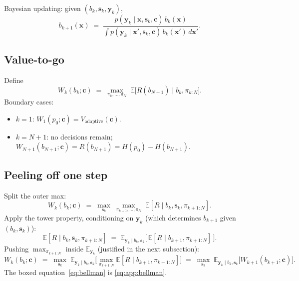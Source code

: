 \documentclass[11pt,a4paper]{article}
\newcommand{\E}{\mathbb{E}}
\begin{document}
Bayesian updating: given $(b_k, \bm{s}_k, \bm{y}_k)$,
\begin{equation}
  b_{k+1}(\bm{x}) \;=\; \frac{p(\bm{y}_k \mid \bm{x}, \bm{s}_k, \bm{c})\, b_k(\bm{x})}{\int p(\bm{y}_k \mid \bm{x}', \bm{s}_k, \bm{c})\, b_k(\bm{x}')\, d\bm{x}'}.
\end{equation}

\subsection{Value-to-go}

Define
\begin{equation}
  W_k(b_k; \bm{c}) \;=\; \max_{\pi_k, \ldots, \pi_N}\; \E\!\bigl[R(b_{N+1}) \mid b_k, \pi_{k:N}\bigr].
  \label{eq:app:vtg}
\end{equation}
Boundary cases:
\begin{itemize}[nosep]
  \item $k = 1$: $W_1(p_0; \bm{c}) = V_{\mathrm{adaptive}}(\bm{c})$.
  \item $k = N + 1$: no decisions remain; $W_{N+1}(b_{N+1}; \bm{c}) = R(b_{N+1}) = H(p_0) - H(b_{N+1})$.
\end{itemize}

\subsection{Peeling off one step}

Split the outer max:
\begin{equation}
  W_k(b_k; \bm{c}) \;=\; \max_{\bm{s}_k}\; \max_{\pi_{k+1}, \ldots, \pi_N}\; \E[R \mid b_k, \bm{s}_k, \pi_{k+1:N}].
\end{equation}
Apply the tower property, conditioning on $\bm{y}_k$ (which determines $b_{k+1}$ given $(b_k, \bm{s}_k)$):
\begin{equation}
  \E[R \mid b_k, \bm{s}_k, \pi_{k+1:N}] \;=\; \E_{\bm{y}_k \mid b_k, \bm{s}_k}\!\bigl[\,\E[R \mid b_{k+1}, \pi_{k+1:N}]\,\bigr].
\end{equation}
Pushing $\max_{\pi_{k+1:N}}$ inside $\E_{\bm{y}_k}$ (justified in the next subsection):
\begin{equation}
  W_k(b_k; \bm{c}) \;=\; \max_{\bm{s}_k}\; \E_{\bm{y}_k \mid b_k, \bm{s}_k}\!\bigl[\max_{\pi_{k+1:N}} \E[R \mid b_{k+1}, \pi_{k+1:N}]\bigr] \;=\; \max_{\bm{s}_k}\; \E_{\bm{y}_k \mid b_k, \bm{s}_k}\!\bigl[W_{k+1}(b_{k+1}; \bm{c})\bigr].
  \label{eq:app:bellman}
\end{equation}
The boxed equation~\eqref{eq:bellman} is \eqref{eq:app:bellman}.
\end{document}
